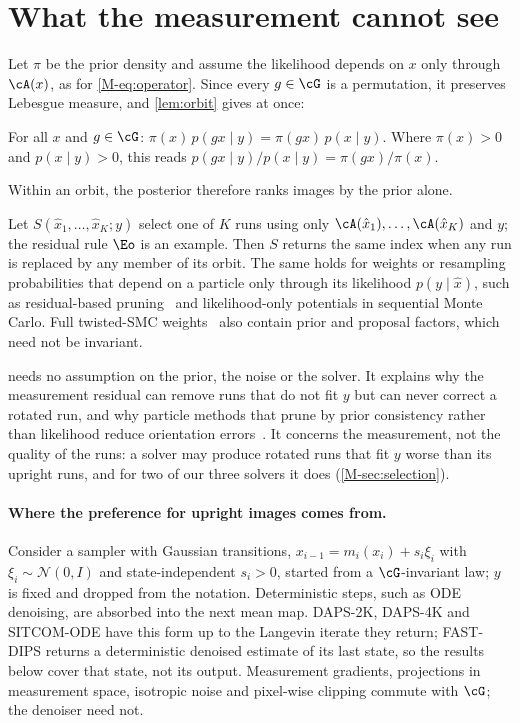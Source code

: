 \section{What the measurement cannot see}
\label{sec:symmetry}

Let $\pi$ be the prior density and assume the likelihood depends on $x$ only through $\cA(x)$, as for \cref{M-eq:operator}.
Since every $g\in\cG$ is a permutation, it preserves Lebesgue measure, and \cref{lem:orbit} gives at once:

\begin{proposition}
\label{prop:ratio}
For all $x$ and $g\in\cG$: $\pi(x)\,p(gx\mid y)=\pi(gx)\,p(x\mid y)$. Where $\pi(x)>0$ and $p(x\mid y)>0$, this reads $p(gx\mid y)/p(x\mid y)=\pi(gx)/\pi(x)$.
\end{proposition}

Within an orbit, the posterior therefore ranks images by the prior alone.

\begin{corollary}
\label{cor:blind}
Let $S(\hat x_1,\dots,\hat x_K;y)$ select one of $K$ runs using only $\cA(\hat x_1),\dots,\cA(\hat x_K)$ and $y$; the residual rule $\Eo$ is an example.
Then $S$ returns the same index when any run is replaced by any member of its orbit.
The same holds for weights or resampling probabilities that depend on a particle only through its likelihood $p(y\mid\hat x)$, such as residual-based pruning~\cite{makris2026tgd} and likelihood-only potentials in sequential Monte Carlo.
Full twisted-SMC weights~\cite{wu2023tds} also contain prior and proposal factors, which need not be invariant.
\end{corollary}

 needs no assumption on the prior, the noise or the solver.
It explains why the measurement residual can remove runs that do not fit $y$ but can never correct a rotated run, and why particle methods that prune by prior consistency rather than likelihood reduce orientation errors~\cite{kocabas2026pcdaps}.
It concerns the measurement, not the quality of the runs: a solver may produce rotated runs that fit $y$ worse than its upright runs, and for two of our three solvers it does (\cref{M-sec:selection}).

\paragraph{Where the preference for upright images comes from.}
Consider a sampler with Gaussian transitions, $x_{i-1}=m_i(x_i)+s_i\xi_i$ with $\xi_i\sim\mathcal N(0,I)$ and state-independent $s_i>0$, started from a $\cG$-invariant law; $y$ is fixed and dropped from the notation.
Deterministic steps, such as ODE denoising, are absorbed into the next mean map.
DAPS-2K, DAPS-4K and SITCOM-ODE have this form up to the Langevin iterate they return; FAST-DIPS returns a deterministic denoised estimate of its last state, so the results below cover that state, not its output.
Measurement gradients, projections in measurement space, isotropic noise and pixel-wise clipping commute with $\cG$; the denoiser need not.

